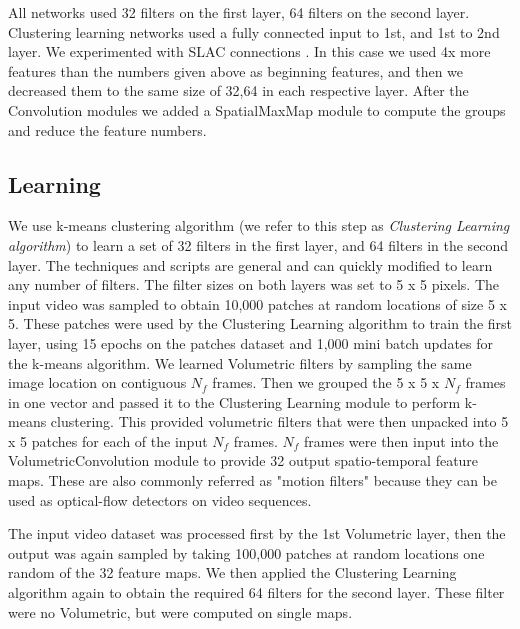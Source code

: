 \documentclass{article} %
\begin{document}
All networks used 32 filters on the first layer, 64 filters on the second layer. Clustering learning networks used a fully connected input to 1st, and 1st to 2nd layer. We experimented with SLAC connections \cite{coates2012emergence}. In this case we used 4x more features than the numbers given above as beginning features, and then we decreased them to the same size of 32,64 in each respective layer. After the Convolution modules we added a SpatialMaxMap module to compute the groups and reduce the feature numbers.



\subsection{Learning}
We use k-means clustering algorithm (we refer to this step as \textit{Clustering Learning algorithm}) to learn a set of 32 filters in the first layer, and 64 filters in the second layer. The techniques and scripts are general and can quickly modified to learn any number of filters. The filter sizes on both layers was set to 5 x 5 pixels.
The input video was sampled to obtain 10,000 patches at random locations of size 5 x 5. These patches were used by the Clustering Learning algorithm to train the first layer, using 15 epochs on the patches dataset and 1,000 mini batch updates for the k-means algorithm. We learned Volumetric filters by sampling the same image location on contiguous $N_f$ frames. Then we grouped the 5 x 5 x $N_f$ frames in one vector and passed it to the Clustering Learning module to perform k-means clustering. This provided volumetric filters that were then unpacked into 5 x 5 patches for each of the input $N_f$ frames. $N_f$ frames were then input into the VolumetricConvolution module to provide 32 output spatio-temporal feature maps. These are also commonly referred as "motion filters" because they can be used as optical-flow detectors on video sequences.

The input video dataset was processed first by the 1st Volumetric layer, then the output was again sampled by taking 100,000 patches at random locations one random of the 32 feature maps. We then applied the Clustering Learning algorithm again to obtain the required 64 filters for the second layer. These filter were no Volumetric, but were computed on single maps. 
\end{document}
